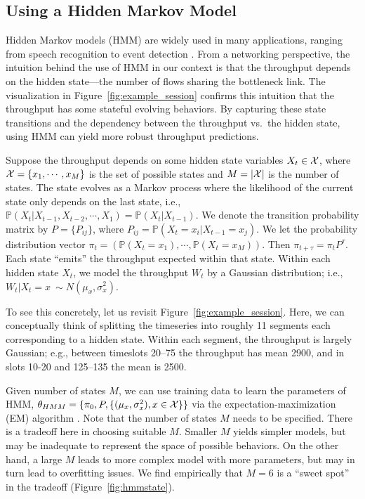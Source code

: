 \subsection{Using a Hidden Markov Model}
\label{sec:premodel:hmm}

Hidden Markov models (HMM) are widely used in many applications, ranging from
speech recognition to event detection \cite{bishop2006pattern}. From a
networking perspective, the intuition behind the use of HMM in our context is
that the throughput depends on the hidden state---the number of flows
sharing the bottleneck link.  The visualization in
Figure~\ref{fig:example_session} confirms this intuition that the throughput
has some stateful evolving behaviors.  By capturing these state transitions and
the dependency between the throughput vs.\ the hidden state, using HMM can
yield more robust throughput predictions.

 Suppose the throughput depends on some hidden
state variables $X_t\in{\cal X}$, where ${\cal X} = \{x_1,\cdots, x_M\}$ is the
set of possible states and $M = |{\cal X}|$ is the number of states.  The state
evolves as a Markov process where the likelihood of the current state only
depends on the last state, i.e., $\mathbb{P}(X_t|X_{t-1},X_{t-2},\cdots, X_1) =
\mathbb{P}(X_t|X_{t-1})$. We denote the transition probability matrix by
$P=\{P_{ij}\}$, where $P_{ij} = \mathbb{P}(X_t = x_i|X_{t-1}=x_j)$.  We let the
probability distribution vector $\pi_t = (\mathbb{P}(X_t = x_1), \cdots,
\mathbb{P}(X_t = x_M))$.  Then $\pi_{t+\tau} = \pi_{t}P^{\tau}$.  Each state ``emits''
the throughput expected within that state. Within each  hidden state
$X_t$, we model  the  throughput $W_t$ by a  Gaussian distribution; i.e., $W_t|X_t=x \
\sim N(\mu_x, \sigma_x^2)$.

To see this concretely, let us revisit Figure~\ref{fig:example_session}.  Here,
we can conceptually think of splitting the timeseries into roughly 11
 segments each corresponding to a hidden  state.  Within each segment, the
throughput is largely Gaussian;  e.g., between timeslots 20--75 the throughput
has mean 2900, and in slots 10-20 and 125--135 the mean is  2500.

 Given number of states $M$, we can  use training data
to  learn the parameters of HMM, $\theta_{HMM} = \{\pi_0, P, \{(\mu_x,
\sigma_x^2), x\in{\cal X}\}\}$ via the expectation-maximization (EM) algorithm
\cite{bishop2006pattern}.  Note that the number of states $M$ needs to be
specified. There is a tradeoff here in choosing suitable $M$.  Smaller $M$
yields simpler models, but may be inadequate to represent the space of possible
behaviors.  On the other hand, a large $M$ leads to more complex model with
more parameters, but may in turn lead to overfitting issues.   We find
empirically that $M=6$ is a ``sweet spot'' in the tradeoff (Figure~\ref{fig:hmmstate}).

